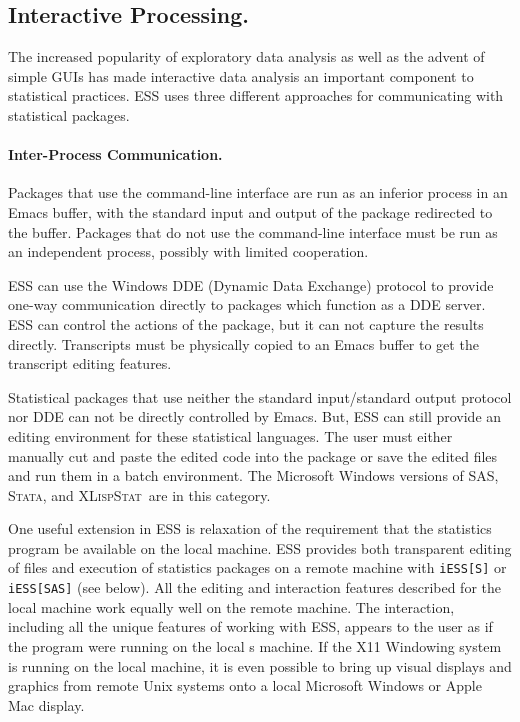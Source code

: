 \documentclass{article}
\newcommand*{\SAS}{\textsc{SAS}}
\newcommand*{\XLispStat}{\textsc{XLispStat}}
\newcommand*{\Stata}{\textsc{Stata}}
\newcommand{\stexttt}[1]{{\small\texttt{#1}}}
\begin{document}
\subsection{Interactive Processing.}
\label{sec:interactive}

The increased popularity of exploratory data analysis as well as the
advent of simple GUIs has made interactive data analysis an important
component to statistical practices.
ESS uses three different approaches for communicating with statistical
packages.

\paragraph{Inter-Process Communication.}
Packages that use the command-line interface are run as an inferior
process in an Emacs buffer, with the standard input and output of the
package redirected to the buffer.  Packages that do not use the
command-line interface must be run as an independent process, possibly
with limited cooperation.

ESS can use the Windows DDE (Dynamic Data Exchange) protocol to
provide one-way communication directly to packages which function as a
DDE server.  ESS can control the actions of the package, but it can not capture
the results directly.  Transcripts must be physically copied to an
Emacs buffer to get the transcript editing features.

Statistical packages that use neither the standard input/standard
output protocol nor DDE can not be directly controlled by Emacs.  But, ESS
can still provide an editing environment for these statistical languages.  The
user must either manually cut and paste the edited code into the
package or save the edited files and run them in a batch environment.
The Microsoft Windows versions of \SAS, \Stata, and \XLispStat\ are
in this category.

One useful extension in ESS is relaxation of the requirement that the
statistics program be available on the local machine.  ESS provides
both transparent editing of files and execution of statistics packages
on a remote machine with \stexttt{iESS[S]} or \stexttt{iESS[SAS]} (see
below).  All the editing and interaction features described for the
local machine work equally well on the remote machine.  The
interaction, including all the unique features of working with ESS,
appears to the user as if the program were running on the local
s%
machine.  If the X11 Windowing system is running on the local machine,
it is even possible to bring up visual displays and graphics from
remote Unix systems onto a local Microsoft Windows or Apple Mac
display.
\end{document}

